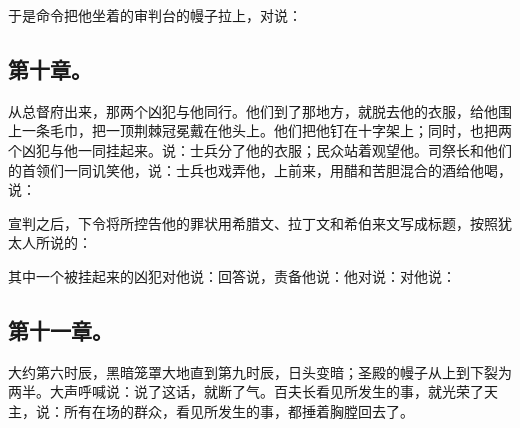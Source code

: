 于是命令把他坐着的审判台的幔子拉上，对说：\par


\subsection{第十章。}

从总督府出来，那两个凶犯与他同行。他们到了那地方，就脱去他的衣服，给他围上一条毛巾，把一顶荆棘冠冕戴在他头上。他们把他钉在十字架上；同时，也把两个凶犯与他一同挂起来。说：士兵分了他的衣服；民众站着观望他。司祭长和他们的首领们一同讥笑他，说：士兵也戏弄他，上前来，用醋和苦胆混合的酒给他喝，说：\par

宣判之后，下令将所控告他的罪状用希腊文、拉丁文和希伯来文写成标题，按照犹太人所说的：\par

其中一个被挂起来的凶犯对他说：回答说，责备他说：他对说：对他说：\par


\subsection{第十一章。}

大约第六时辰，黑暗笼罩大地直到第九时辰，日头变暗；圣殿的幔子从上到下裂为两半。大声呼喊说：说了这话，就断了气。百夫长看见所发生的事，就光荣了天主，说：所有在场的群众，看见所发生的事，都捶着胸膛回去了。\par

